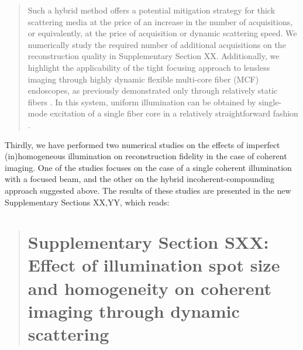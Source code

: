 \documentclass[12pt]{article}
\newenvironment{ourresponse}
    {\begin{tcolorbox}[width=\linewidth,breakable,enhanced,colback=gray!5,colframe=responsecolor!50,title=Response,left=5pt,right=5pt]}
    {\end{tcolorbox}}
\begin{document}
\begin{ourresponse}
\begin{quote}
    Such a hybrid method offers a potential mitigation strategy for thick scattering media at the price of an increase in the number of acquisitions, or equivalently, at the price of acquisition or dynamic scattering speed. We numerically study the required number of additional acquisitions on the reconstruction quality in Supplementary Section XX.
    Additionally, we highlight the applicability of the tight focusing approach to lensless imaging through highly dynamic flexible multi-core fiber (MCF) endoscopes, as previously demonstrated only through relatively static fibers \cite{choi2022flexible, haim2025image}. In this system, uniform illumination can be obtained by single-mode excitation of a single fiber core in a relatively straightforward fashion \cite{weinberg2024ptychographic}.
    \end{quote}


Thirdly, we have performed two numerical studies on the effects of imperfect (in)homogeneous illumination on reconstruction fidelity in the case of coherent imaging. One of the studies focuses on the case of a single coherent illumination with a focused beam, and the other on the hybrid incoherent-compounding approach suggested above.
The results of these studies are presented in the new Supplementary Sections XX,YY, which reads:

    \begin{quote}
    \section*{Supplementary Section SXX: Effect of illumination spot size and homogeneity on coherent imaging through dynamic scattering}


\end{quote}
\end{ourresponse}
\end{document}
